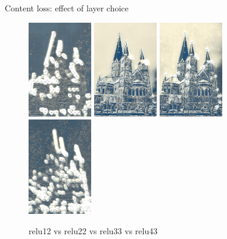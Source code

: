 \documentclass{beamer}
\begin{document}
    \begin{frame}{Content loss: effect of layer choice}

        \begin{figure}
            \includegraphics[width=0.248\textwidth, height=0.4\textheight]{bonn_muenster_tsunami_relu12}
            \hfill
            \includegraphics[width=0.248\textwidth, height=0.4\textheight]{bonn_muenster_tsunami_relu22}
            \hfill
            \includegraphics[width=0.248\textwidth, height=0.4\textheight]{bonn_muenster_tsunami_relu33}
            \hfill
            \includegraphics[width=0.248\textwidth, height=0.4\textheight]{bonn_muenster_tsunami_relu43}
            \caption{\label{fig:clutter}relu12 vs relu22 vs relu33 vs relu43}
        \end{figure}

    \end{frame}
\end{document}
